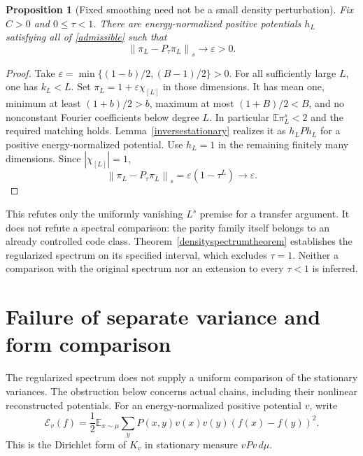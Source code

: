 \documentclass[11pt]{article}
\newcommand{\E}{\mathbb E}
\newcommand{\norm}[1]{\left\|#1\right\|}
\newtheorem{proposition}[theorem]{Proposition}
\begin{document}
\begin{proposition}[Fixed smoothing need not be a small density perturbation]\label{densityperturbationfailure}
Fix $C>0$ and $0\leq\tau<1$. There are energy-normalized positive
potentials $h_L$ satisfying all of \eqref{admissible} such that
\[
 \norm{\pi_L-P_\tau\pi_L}_s\longrightarrow\varepsilon>0.
\]
\end{proposition}
\begin{proof}
Take $\varepsilon=\min\{(1-b)/2,(B-1)/2\}>0$. For all sufficiently
large $L$, one has $k_L<L$. Set $\pi_L=1+\varepsilon\chi_{[L]}$ in
those dimensions. It has mean one, minimum at least $(1+b)/2>b$,
maximum at most $(1+B)/2<B$, and no nonconstant Fourier coefficients
below degree $L$. In particular $\E\pi_L^s<2$ and the required matching
holds. Lemma~\ref{inversestationary} realizes it as $h_LPh_L$ for a
positive energy-normalized potential. Use $h_L=1$ in the remaining
finitely many dimensions. Since $|\chi_{[L]}|=1$,
\[
 \norm{\pi_L-P_\tau\pi_L}_s
       =\varepsilon(1-\tau^L)\longrightarrow\varepsilon.
\]
\end{proof}
This refutes only the uniformly vanishing $L^s$ premise for a transfer
argument. It does not refute a spectral comparison: the parity family
itself belongs to an already controlled code class. Theorem~\ref{densityspectrumtheorem}
establishes the regularized spectrum on its specified interval, which
excludes $\tau=1$. Neither a comparison with the original spectrum nor
an extension to every $\tau<1$ is inferred.

\section{Failure of separate variance and form comparison}\label{separatecomparison}
The regularized spectrum does not supply a uniform comparison of the
stationary variances. The obstruction below concerns actual chains,
including their nonlinear reconstructed potentials. For an energy-normalized
positive potential $v$, write
\[
 \mathcal E_v(f)=\frac12\E_{x\sim\mu}\sum_y
 P(x,y)v(x)v(y)(f(x)-f(y))^2.
\]
This is the Dirichlet form of $K_v$ in stationary measure $vPv\,d\mu$.
\end{document}
